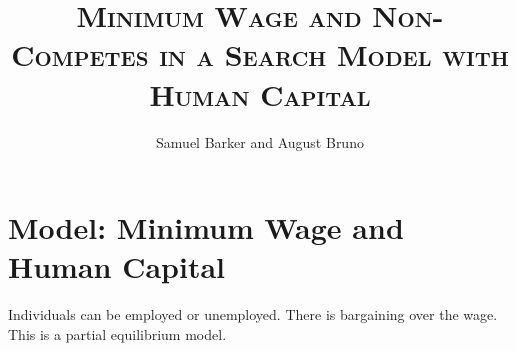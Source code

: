 \documentclass[11pt]{article}
\title{\textsc{Minimum Wage and Non-Competes in a Search Model with Human
Capital}}
\author{Samuel Barker and August Bruno}
\begin{document}
\maketitle
\setcounter{page}{1}
\begin{abstract}
\end{abstract}

\tableofcontents

\section[Model Minimum Wage and Human Capital]{Model: Minimum Wage and Human
Capital}%
\label{sec:model_minimum_wage_and_human_capital}

Individuals can be employed or unemployed. There is bargaining over the
wage. This is a partial equilibrium model.



\appendix
%
\end{document}
